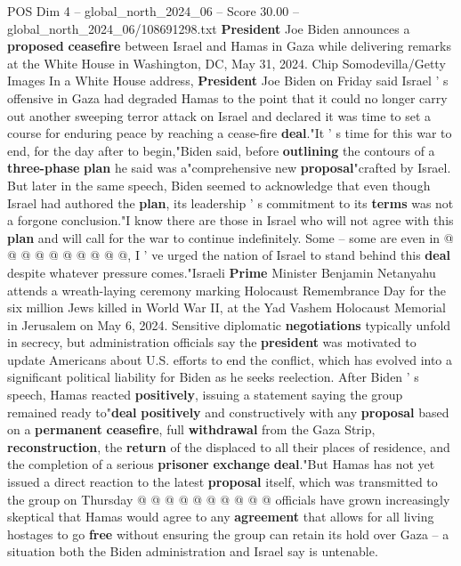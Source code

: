 \begin{textsample}{POS Dim 4 – global\_north\_2024\_06 – Score 30.00 – global\_north\_2024\_06/108691298.txt}  \label{ex:f4_pos_142}
\textbf{President} Joe Biden announces a \textbf{proposed} \textbf{ceasefire} between Israel and Hamas in Gaza while delivering remarks at the White House in Washington, DC, May 31, 2024.
Chip Somodevilla/Getty Images In a White House address, \textbf{President} Joe Biden on Friday said Israel ' s offensive in Gaza had degraded Hamas to the point that it could no longer carry out another sweeping terror attack on Israel and declared it was time to set a course for enduring peace by reaching a cease-fire \textbf{deal}."It ' s time for this war to end, for the day after to begin,"Biden said, before \textbf{outlining} the contours of a \textbf{three-phase} \textbf{plan} he said was a"comprehensive new \textbf{proposal}"crafted by Israel.
But later in the same speech, Biden seemed to acknowledge that even though Israel had authored the \textbf{plan}, its leadership ' s commitment to its \textbf{terms} was not a forgone conclusion."I know there are those in Israel who will not agree with this \textbf{plan} and will call for the war to continue indefinitely.
Some -- some are even in @ @ @ @ @ @ @ @ @ @, I ' ve urged the nation of Israel to stand behind this \textbf{deal} despite whatever pressure comes."Israeli \textbf{Prime} Minister Benjamin Netanyahu attends a wreath-laying ceremony marking Holocaust Remembrance Day for the six million Jews killed in World War II, at the Yad Vashem Holocaust Memorial in Jerusalem on May 6, 2024.
Sensitive diplomatic \textbf{negotiations} typically unfold in secrecy, but administration officials say the \textbf{president} was motivated to update Americans about U.S. efforts to end the conflict, which has evolved into a significant political liability for Biden as he seeks reelection.
After Biden ' s speech, Hamas reacted \textbf{positively}, issuing a statement saying the group remained ready to"\textbf{deal} \textbf{positively} and constructively with any \textbf{proposal} based on a \textbf{permanent} \textbf{ceasefire}, full \textbf{withdrawal} from the Gaza Strip, \textbf{reconstruction}, the \textbf{return} of the displaced to all their places of residence, and the completion of a serious \textbf{prisoner} \textbf{exchange} \textbf{deal}."But Hamas has not yet issued a direct reaction to the latest \textbf{proposal} itself, which was transmitted to the group on Thursday @ @ @ @ @ @ @ @ @ @ officials have grown increasingly skeptical that Hamas would agree to any \textbf{agreement} that allows for all living hostages to go \textbf{free} without ensuring the group can retain its hold over Gaza -- a situation both the Biden administration and Israel say is untenable.

\end{textsample}
